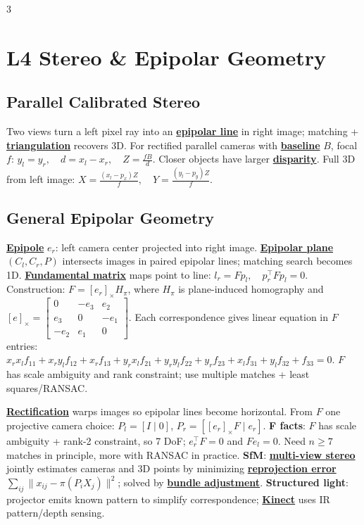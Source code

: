 \documentclass{article}
\numberwithin{equation}{subsection}
\newcommand{\key}[1]{\textbf{#1}}
\newcommand{\lowterm}[1]{\textbf{\underline{#1}}}
\begin{document}
\begin{multicols*}{3}
\section{L4 Stereo \& Epipolar Geometry}
\subsection{Parallel Calibrated Stereo}
Two views turn a left pixel ray into an \lowterm{epipolar line} in right image; matching + \lowterm{triangulation} recovers 3D. For rectified parallel cameras with \lowterm{baseline} $B$, focal $f$:
\(
y_l=y_r,\quad d=x_l-x_r,\quad Z=\frac{fB}{d}.
\)
Closer objects have larger \lowterm{disparity}. Full 3D from left image:
\(
X=\frac{(x_l-p_x)Z}{f},\quad Y=\frac{(y_l-p_y)Z}{f}.
\)


\subsection{General Epipolar Geometry}
\lowterm{Epipole} $e_r$: left camera center projected into right image. \lowterm{Epipolar plane} $(C_l,C_r,P)$ intersects images in paired epipolar lines; matching search becomes 1D. \lowterm{Fundamental matrix} maps point to line:
\(
l_r=Fp_l,\quad p_r^\top Fp_l=0.
\)
Construction: $F=[e_r]_\times H_\pi$, where $H_\pi$ is plane-induced homography and
\(
[e]_\times=\begin{bmatrix}0&-e_3&e_2\\e_3&0&-e_1\\-e_2&e_1&0\end{bmatrix}.
\)
Each correspondence gives linear equation in $F$ entries:
\(
x_rx_lf_{11}+x_ry_lf_{12}+x_rf_{13}
+y_rx_lf_{21}+y_ry_lf_{22}
+y_rf_{23}+x_lf_{31}+y_lf_{32}+f_{33}=0 .
\)
$F$ has scale ambiguity and rank constraint; use multiple matches + least squares/RANSAC. 

\lowterm{Rectification} warps images so epipolar lines become horizontal. From $F$ one projective camera choice: $P_l=[I\mid0]$, $P_r=[[e_r]_\times F\mid e_r]$.
\key{F facts}: $F$ has scale ambiguity + rank-2 constraint, so 7 DoF; $e_r^\top F=0$ and $Fe_l=0$. Need $n\ge7$ matches in principle, more with RANSAC in practice. \key{SfM}: \lowterm{multi-view stereo} jointly estimates cameras and 3D points by minimizing \lowterm{reprojection error} $\sum_{ij}\|x_{ij}-\pi(P_iX_j)\|^2$; solved by \lowterm{bundle adjustment}. \key{Structured light}: projector emits known pattern to simplify correspondence; \lowterm{Kinect} uses IR pattern/depth sensing.


\end{multicols*}
\end{document}

